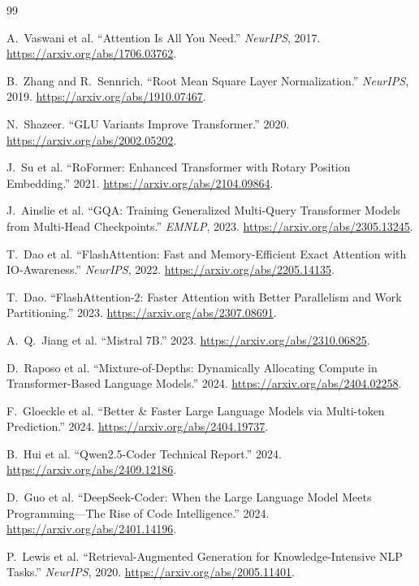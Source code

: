 \documentclass[10pt,letterpaper]{article}
\newcommand{\1}{\mathbb{1}}
\begin{document}
\begin{thebibliography}{99}
\small

A.~Vaswani et al. ``Attention Is All You Need.'' \emph{NeurIPS}, 2017.
\url{https://arxiv.org/abs/1706.03762}.

B.~Zhang and R.~Sennrich. ``Root Mean Square Layer Normalization.'' \emph{NeurIPS}, 2019.
\url{https://arxiv.org/abs/1910.07467}.

N.~Shazeer. ``GLU Variants Improve Transformer.'' 2020.
\url{https://arxiv.org/abs/2002.05202}.

J.~Su et al. ``RoFormer: Enhanced Transformer with Rotary Position Embedding.'' 2021.
\url{https://arxiv.org/abs/2104.09864}.

J.~Ainslie et al. ``GQA: Training Generalized Multi-Query Transformer Models from Multi-Head
Checkpoints.'' \emph{EMNLP}, 2023. \url{https://arxiv.org/abs/2305.13245}.

T.~Dao et al. ``FlashAttention: Fast and Memory-Efficient Exact Attention with IO-Awareness.''
\emph{NeurIPS}, 2022. \url{https://arxiv.org/abs/2205.14135}.

T.~Dao. ``FlashAttention-2: Faster Attention with Better Parallelism and Work Partitioning.'' 2023.
\url{https://arxiv.org/abs/2307.08691}.

A.~Q.~Jiang et al. ``Mistral 7B.'' 2023. \url{https://arxiv.org/abs/2310.06825}.

D.~Raposo et al. ``Mixture-of-Depths: Dynamically Allocating Compute in Transformer-Based Language
Models.'' 2024. \url{https://arxiv.org/abs/2404.02258}.

F.~Gloeckle et al. ``Better \& Faster Large Language Models via Multi-token Prediction.'' 2024.
\url{https://arxiv.org/abs/2404.19737}.

B.~Hui et al. ``Qwen2.5-Coder Technical Report.'' 2024.
\url{https://arxiv.org/abs/2409.12186}.

D.~Guo et al. ``DeepSeek-Coder: When the Large Language Model Meets Programming---The Rise of Code
Intelligence.'' 2024. \url{https://arxiv.org/abs/2401.14196}.

P.~Lewis et al. ``Retrieval-Augmented Generation for Knowledge-Intensive NLP Tasks.''
\emph{NeurIPS}, 2020. \url{https://arxiv.org/abs/2005.11401}.


\end{thebibliography}
\end{document}
